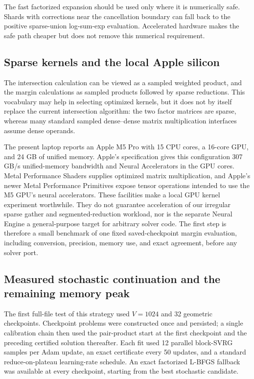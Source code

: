 \documentclass[11pt]{article}
\begin{document}
The fast factorized expansion should be used only where it is numerically
safe.  Shards with corrections near the cancellation boundary can fall back
to the positive sparse-union log-sum-exp evaluation.  Accelerated hardware
makes the safe path cheaper but does not remove this numerical requirement.

\subsection{Sparse kernels and the local Apple silicon}

The intersection calculation can be viewed as a sampled weighted product,
and the margin calculations as sampled products followed by sparse
reductions.  This vocabulary may help in selecting optimized kernels, but it
does not by itself replace the current intersection algorithm: the two factor
matrices are sparse, whereas many standard sampled dense--dense matrix
multiplication interfaces assume dense operands.

The present laptop reports an Apple M5 Pro with 15 CPU cores, a 16-core GPU,
and 24 GB of unified memory.  Apple's specification gives this configuration
307 GB/s unified-memory bandwidth and Neural Accelerators in the GPU cores.
Metal Performance Shaders supplies optimized matrix multiplication, and
Apple's newer Metal Performance Primitives expose tensor operations intended
to use the M5 GPU's neural accelerators.  These facilities make a local GPU
kernel experiment worthwhile.  They do not guarantee acceleration of our
irregular sparse gather and segmented-reduction workload, nor is the separate
Neural Engine a general-purpose target for arbitrary solver code.  The first
step is therefore a small benchmark of one fixed saved-checkpoint margin
evaluation, including conversion, precision, memory use, and exact agreement,
before any solver port.

\subsection{Measured stochastic continuation and the remaining memory peak}

The first full-file test of this strategy used $V=1024$ and 32 geometric
checkpoints.  Checkpoint problems were constructed once and persisted; a
single calibration chain then used the pair-product start at the first
checkpoint and the preceding certified solution thereafter.  Each fit used
12 parallel block-SVRG samples per Adam update, an exact certificate every
50 updates, and a standard reduce-on-plateau learning-rate schedule.  An
exact factorized L-BFGS fallback was available at every checkpoint, starting
from the best stochastic candidate.
\end{document}
